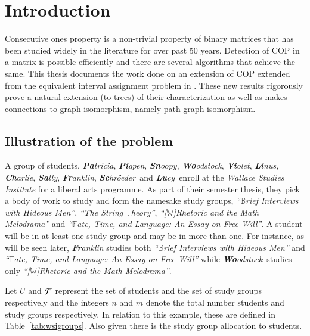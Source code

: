 \documentclass[MS,synopsis]{iitmdiss}
\title{\mythesistitle}
\author{\myname}
\date{\MakeUppercase
  {\mysubmissionmonth}}
\def \secfirstparatrim {-5mm}
\def \LLL {{\em ``$\mathbb{B}$rief Interviews with Hideous Men''}}
\def \GGG {{\em ``The String $\mathbb{T}$heory''}}
\def \BBB {{\em ``[$\mathbb{W}$]Rhetoric and the Math Melodrama''}}
\def \TTT {{\em ``$\mathbb{F}$ate, Time, and Language: An Essay on Free Will''}}
\def \Pa {{\em {\bf Pa}tricia}}
\def \Pi {{\em {\bf Pi}gpen}}
\def \Sn {{\em {\bf Sn}oopy}}
\def \Wo {{\em {\bf Wo}odstock}}
\def \Vi {{\em {\bf Vi}olet}}
\def \Li {{\em {\bf Li}nus}}
\def \Ch {{\em {\bf Ch}arlie}}
\def \Sa {{\em {\bf Sa}lly}}
\def \Fr {{\em {\bf Fr}anklin}}
\def \Sc {{\em {\bf Sc}hr{\"o}eder}}
\def \Lu {{\em {\bf Lu}cy}}
\def \WSI {{\em Wallace Studies Institute}}
\begin{document}
\maketitle

\setcounter{page}{0}

\section{Introduction}
\label{sec:intro}
\vspace{\secfirstparatrim} 

Consecutive ones property is a non-trivial property of binary matrices
that has been studied widely in the literature for over past 50
years. Detection of COP in a matrix is possible efficiently and there
are several algorithms that achieve the same. This thesis documents
the work done on an extension of COP extended from the equivalent
interval assignment problem in \cite{nsnrs09}. These new results
rigorously prove a natural extension (to trees) of their
characterization as well as makes connections to graph isomorphism,
namely path graph isomorphism.


\subsection{Illustration of the problem}
\label{sec:problem}
\vspace{\secfirstparatrim}

A group of students, \Pa, \Pi, \Sn, \Wo, \Vi, \Li, \Ch, \Sa, \Fr,
  \Sc\ and \Lu\ enroll at the
  {\WSI} for a liberal arts programme.  As part of their semester
  thesis, they pick a body of work to study and form the namesake
  study groups, {\LLL}, {\GGG}, {\BBB} and {\TTT}. A student will be in at least one study
  group and may be in more than one. For instance, as will be seen
  later, {\Fr} studies both {\LLL} and {\TTT} while \Wo\ studies only
  \BBB.

Let $U$ and ${\cal F}$ represent the set of students and the set of study
groups respectively and the integers $n$ and $m$ denote the total
number students and study groups respectively. In relation to this
example, these are defined in Table~\ref{tab:wsigroups}. Also given
there is the study group allocation to students.
\end{document}
